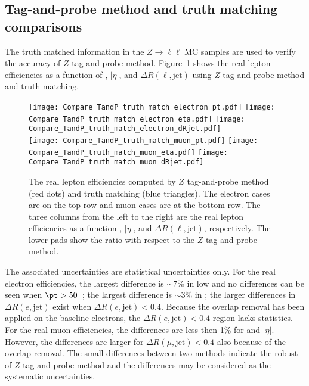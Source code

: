 \subsection{Tag-and-probe method and truth matching comparisons}
\label{subsec:app_RLE_truth_matched}
The truth matched information in the $Z \to \ell \ell$ MC samples are used to verify the accuracy of $Z$ tag-and-probe method.
Figure~\ref{fig:app_RLE_TandP_truth_match_comparisons} shows the real lepton efficiencies as a function of \pt, $|\eta|$, and $\Delta R(\ell, \mathrm{jet})$ using $Z$ tag-and-probe method and truth matching.
%
\begin{figure}[htbp]
    \texttt{[image: Compare\_TandP\_truth\_match\_electron\_pt.pdf]}
    \texttt{[image: Compare\_TandP\_truth\_match\_electron\_eta.pdf]}
    \texttt{[image: Compare\_TandP\_truth\_match\_electron\_dRjet.pdf]}\\
    \texttt{[image: Compare\_TandP\_truth\_match\_muon\_pt.pdf]}
    \texttt{[image: Compare\_TandP\_truth\_match\_muon\_eta.pdf]}
    \texttt{[image: Compare\_TandP\_truth\_match\_muon\_dRjet.pdf]}
    \caption{The real lepton efficiencies computed by $Z$ tag-and-probe method (red dots) and truth matching (blue triangles).
    The electron cases are on the top row and muon cases are at the bottom row.
    The three columns from the left to the right are the real lepton efficiencies as a function \pt, $|\eta|$, and $\Delta R(\ell, \mathrm{jet})$, respectively.
    The lower pads show the ratio with respect to the $Z$ tag-and-probe method.}
    \label{fig:app_RLE_TandP_truth_match_comparisons}
\end{figure}
%
The associated uncertainties are statistical uncertainties only.
For the real electron efficiencies, the largest difference is $\sim$7\% in low \pt and no differences can be seen when $\pt > 50$~{\GeV}; the largest difference is $\sim$3\% in ; the larger differences in $\Delta R(e, \mathrm{jet})$ exist when $\Delta R(e, \mathrm{jet}) < 0.4$.
Because the overlap removal has been applied on the baseline electrons, the $\Delta R(e, \mathrm{jet}) < 0.4$ region lacks statistics.
For the real muon efficiencies, the differences are less then 1\% for \pt and $|\eta|$.
However, the differences are larger for $\Delta R(\mu, \mathrm{jet}) < 0.4$ also because of the overlap removal.
The small differences between two methods indicate the robust of $Z$ tag-and-probe method and the differences may be considered as the systematic uncertainties.

